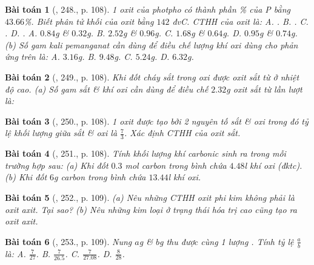 \documentclass{article}
\newtheorem{baitoan}{Bài toán}
\begin{document}
\begin{baitoan}[\cite{An_400_BT_Hoa_Hoc_8_2020}, 248., p. 108]
	1 oxit của photpho có thành phần \% của \emph{P} bằng $43.66$\%. Biết phân tử khối của oxit bằng $142$ \emph{đvC}. CTHH của oxit là: {\sf A.} \emph{}. {\sf B.} \emph{}. {\sf C.} \emph{}. {\sf D.} \emph{}. {\sf A.} $0.84$\emph{g} \& $0.32$\emph{g}. {\sf B.} $2.52$\emph{g} \& $0.96$\emph{g}. {\sf C.} $1.68$\emph{g} \& $0.64$\emph{g}. {\sf D.} $0.95$\emph{g} \& $0.74$\emph{g}. (b) Số gam kali pemanganat \emph{} cần dùng để điều chế lượng khí oxi dùng cho phản ứng trên là: {\sf A.} $3.16$\emph{g}. {\sf B.} $9.48$\emph{g}. {\sf C.} $5.24$\emph{g}. {\sf D.} $6.32$\emph{g}.
\end{baitoan}

\begin{baitoan}[\cite{An_400_BT_Hoa_Hoc_8_2020}, 249., p. 108]
	Khi đốt cháy sắt trong oxi được oxit sắt từ \emph{} ở nhiệt độ cao. (a) Số gam sắt \& khí oxi cần dùng để điều chế $2.32$\emph{g} oxit sắt từ lần lượt là: 
\end{baitoan}

\begin{baitoan}[\cite{An_400_BT_Hoa_Hoc_8_2020}, 250., p. 108]
	1 oxit được tạo bởi 2 nguyên tố sắt \& oxi trong đó tỷ lệ khối lượng giữa sắt \& oxi là $\frac{7}{3}$. Xác định CTHH của oxit sắt.
\end{baitoan}

\begin{baitoan}[\cite{An_400_BT_Hoa_Hoc_8_2020}, 251., p. 108]
	Tính khối lượng khí carbonic sinh ra trong mỗi trường hợp sau: (a) Khi đốt $0.3$ \emph{mol} carbon trong bình chứa $4.48$\emph{l} khí oxi (đktc). (b) Khi đốt $6$\emph{g} carbon trong bình chứa $13.44$\emph{l} khí oxi.
\end{baitoan}

\begin{baitoan}[\cite{An_400_BT_Hoa_Hoc_8_2020}, 252., p. 109]
	(a) Nêu những CTHH oxit phi kim không phải là oxit axit. Tại sao? (b) Nêu những kim loại ở trạng thái hóa trị cao cũng tạo ra oxit axit.
\end{baitoan}

\begin{baitoan}[\cite{An_400_BT_Hoa_Hoc_8_2020}, 253., p. 109]
	Nung $a$\emph{g} \emph{} \& $b$\emph{g} \emph{} thu được cùng 1 lượng \emph{}. Tính tỷ lệ $\frac{a}{b}$ là: {\sf A.} $\frac{7}{27}$. {\sf B.} $\frac{7}{26.5}$. {\sf C.} $\frac{7}{27.08}$. {\sf D.} $\frac{8}{28}$.
\end{baitoan}
\end{document}
